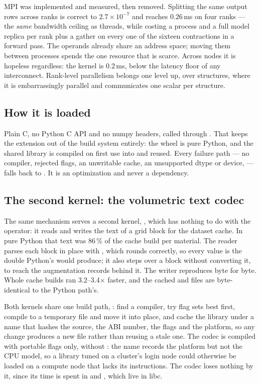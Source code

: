 MPI was implemented and measured, then removed. Splitting the same output rows
across ranks is correct to $2.7\times10^{-7}$ and reaches
$0.26$\,ms on four ranks --- the \emph{same} bandwidth ceiling as threads,
while costing a process and a full model replica per rank plus a gather on
every one of the sixteen contractions in a forward pass. The operands already
share an address space; moving them between processes spends the one resource
that is scarce. Across nodes it is hopeless regardless: the kernel is
$0.2$\,ms, below the latency floor of any interconnect. Rank-level parallelism
belongs one level up, over structures, where it is embarrassingly parallel and
communicates one scalar per structure.

\subsection{How it is loaded}

Plain C, no Python C API and no numpy headers, called through .
That keeps the extension out of the build system entirely: the wheel is pure
Python, and the shared library is compiled on first use into
 and reused. Every failure path --- no
compiler, rejected flags, an unwritable cache, an unsupported dtype or device,
 --- falls back to . It is an
optimization and never a dependency.

\subsection{The second kernel: the volumetric text codec}

The same mechanism serves a second kernel, , which
has nothing to do with the operator: it reads and writes the 
text of a  grid block for the dataset cache. In pure Python that
text was 86\,\% of the cache build per material. The reader parses each
block in place with , which rounds correctly, so every value is
the double Python's  would produce; it also steps over a block
without converting it, to reach the augmentation records behind it. The
writer reproduces  byte for byte. Whole cache
builds ran 3.2--3.4$\times$ faster, and the cached  and
 files are byte-identical to the Python path's.

Both kernels share one build path, : find a compiler,
try flag sets best first, compile to a temporary file and move it into place,
and cache the library under a name that hashes the source, the ABI number,
the flags and the platform, so any change produces a new file rather than
reusing a stale one. The codec is compiled with portable flags only, without
: the name records the platform but not the CPU model, so a
library tuned on a cluster's login node could otherwise be loaded on a compute
node that lacks its instructions. The codec loses nothing by it, since its
time is spent in  and , which live in libc.

